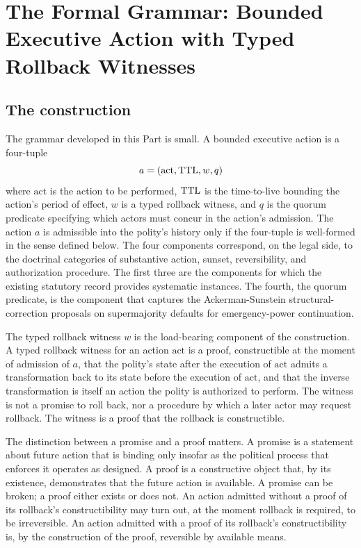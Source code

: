 \section{The Formal Grammar: Bounded Executive Action with Typed Rollback Witnesses}
\label{sec:grammar}

\subsection{The construction}

The grammar developed in this Part is small.
A bounded executive action is a four-tuple
\[
a = (\text{act}, \mathrm{TTL}, w, q)
\]
where $\text{act}$ is the action to be performed, $\mathrm{TTL}$ is the time-to-live bounding the action's
period of effect, $w$ is a typed rollback witness, and $q$ is the quorum predicate specifying which actors
must concur in the action's admission.
The action $a$ is admissible into the polity's history only if the four-tuple is well-formed in the sense
defined below.
The four components correspond, on the legal side, to the doctrinal categories of substantive action,
sunset, reversibility, and authorization procedure.
The first three are the components for which the existing statutory record provides systematic instances.
The fourth, the quorum predicate, is the component that captures the Ackerman-Sunstein structural-correction
proposals on supermajority defaults for emergency-power continuation.

The typed rollback witness $w$ is the load-bearing component of the construction.
A typed rollback witness for an action $\text{act}$ is a proof, constructible at the moment of admission of $a$,
that the polity's state after the execution of $\text{act}$ admits a transformation back to its state before
the execution of $\text{act}$,
and that the inverse transformation is itself an action the polity is authorized to perform.
The witness is not a promise to roll back, nor a procedure by which a later actor may request rollback.
The witness is a proof that the rollback is constructible.

The distinction between a promise and a proof matters.
A promise is a statement about future action that is binding only insofar as the political process
that enforces it operates as designed.
A proof is a constructive object that, by its existence, demonstrates that the future action is available.
A promise can be broken; a proof either exists or does not.
An action admitted without a proof of its rollback's constructibility may turn out, at the moment rollback is required,
to be irreversible.
An action admitted with a proof of its rollback's constructibility is, by the construction of the proof,
reversible by available means.

